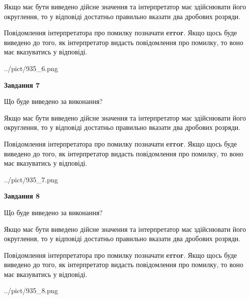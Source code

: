 \documentclass[12pt, ukrainian]{article}
\begin{document}
{\begin {Large}
Якщо має бути виведено дійсне значення та інтерпретатор має здійснювати його округлення, 
то у відповіді достатньо правильно вказати два дробових розряди.

Повідомлення інтерпретатора про помилку позначати \textbf{error}.
Якщо щось буде виведено до того, як інтерпретатор видасть повідомлення про помилку, 
то воно має вказуватись у відповіді. \par

\begin{center}
	{../pict/935_6.png}
\end{center}
\newpage

{\begin {center}\textbf{Завдання 7}\end {center}}\par
Що буде виведено за виконання? \par

Якщо має бути виведено дійсне значення та інтерпретатор має здійснювати його округлення, 
то у відповіді достатньо правильно вказати два дробових розряди.

Повідомлення інтерпретатора про помилку позначати \textbf{error}.
Якщо щось буде виведено до того, як інтерпретатор видасть повідомлення про помилку, 
то воно має вказуватись у відповіді. \par

\begin{center}
	{../pict/935_7.png}
\end{center}
\newpage

{\begin {center}\textbf{Завдання 8}\end {center}}\par
Що буде виведено за виконання? \par

Якщо має бути виведено дійсне значення та інтерпретатор має здійснювати його округлення, 
то у відповіді достатньо правильно вказати два дробових розряди.

Повідомлення інтерпретатора про помилку позначати \textbf{error}.
Якщо щось буде виведено до того, як інтерпретатор видасть повідомлення про помилку, 
то воно має вказуватись у відповіді. \par

\begin{center}
	{../pict/935_8.png}
\end{center}
\newpage


\end{Large}}
\end{document}

